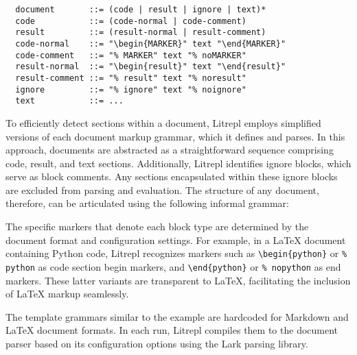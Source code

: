 \documentclass[a4paper,12pt,twocolumn]{article}
\begin{document}
\begin{figure*}[hbt!]
  \centering
  \begin{minipage}{\textwidth}
  \begin{verbatim}
  document       ::= (code | result | ignore | text)*
  code           ::= (code-normal | code-comment)
  result         ::= (result-normal | result-comment)
  code-normal    ::= "\begin{MARKER}" text "\end{MARKER}"
  code-comment   ::= "% MARKER" text "% noMARKER"
  result-normal  ::= "\begin{result}" text "\end{result}"
  result-comment ::= "% result" text "% noresult"
  ignore         ::= "% ignore" text "% noignore"
  text           ::= ...
  \end{verbatim}
  \end{minipage}
  \caption{An illustrative grammar template for LaTeX documents where marker
  serves as a parameter configured via command-line arguments for each supported
  interpreter class.}
  \label{fig:document_representation}
\end{figure*}

To efficiently detect sections within a document, Litrepl employs simplified
versions of each document markup grammar, which it defines and parses. In this
approach, documents are abstracted as a straightforward sequence comprising
code, result, and text sections. Additionally, Litrepl identifies ignore blocks,
which serve as block comments. Any sections encapsulated within these ignore
blocks are excluded from parsing and evaluation. The structure of any document,
therefore, can be articulated using the following informal grammar:

The specific markers that denote each block type are determined by the document
format and configuration settings. For example, in a LaTeX document containing
Python code, Litrepl recognizes markers such as \verb|\begin|\verb|{python}| or
\verb|% |\verb|python| as code section begin markers, and
\verb|\end|\verb|{python}| or \verb|% |\verb|nopython| as end markers. These
latter variants are transparent to LaTeX, facilitating the inclusion of LaTeX
markup seamlessly.

The template grammars similar to the example are hardcoded for Markdown and
LaTeX document formats. In each run, Litrepl compiles them to the document
parser based on its configuration options using the Lark\cite{Lark} parsing
library.
\end{document}
